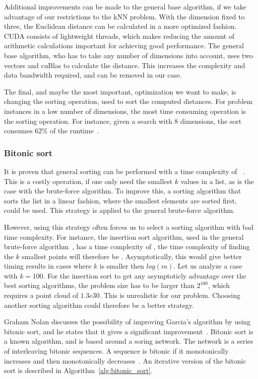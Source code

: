 Additional improvements can be made to the general base algorithm, if we take advantage of our restrictions to the kNN problem. With the dimension fixed to three, the Euclidean distance can be calculated in a more optimized fashion. CUDA consists of lightweight threads, which makes reducing the amount of arithmetic calculations important for achieving good performance. The general base algorithm, who has to take any number of dimensions into account, uses two vectors and cuBlas to calculate the distance. This increases the complexity and data bandwidth required, and can be removed in our case.

The final, and maybe the most important, optimization we want to make, is changing the sorting operation, used to sort the computed distances. For problem instances in a low number of dimensions, the most time consuming operation is the sorting operation. For instance, given a search with $8$ dimensions, the sort consumes $62\%$ of the runtime~\cite{Garcia2008}.

\subsubsection{Bitonic sort} %
\label{ssub:bitonic_sort}

It is proven that general sorting can be performed with a time complexity of ~\cite{Cormen:2001}. This is a costly operation, if one only need the smallest $k$ values in a list, as is the case with the brute-force algorithm. To improve this, a sorting algorithm that sorts the list in a linear fashion, where the smallest elements are sorted first, could be used. This strategy is applied to the general brute-force algorithm.

However, using this strategy often forces us to select a sorting algorithm with bad time complexity. For instance, the insertion sort algorithm, used in the general brute-force algorithm~\cite{Cormen:2001}, has a time complexity of , the time complexity of finding the $k$ smallest points will therefore be . Asymptotically, this would give better timing results in cases where $k$ is smaller then $log(m)$. Let us analyze a case with $k=100$. For the insertion sort to get any asymptoticly advantage over the best sorting algorithms, the problem size has to be larger than $2^{100}$, which requires a point cloud of $1.3e30$. This is unrealistic for our problem. Choosing another sorting algorithm could therefore be a better strategy.

Graham Nolan discusses the possibility of improving Garcia's algorithm by using bitonic sort, and he states that it gives a significant improvement~\citep{Nolan}. Bitonic sort is a known  algorithm, and is based around a soring network. The network is a series of interleaving bitonic sequences. A sequence is bitonic if it monotonically increases and then monotonically decreases~\cite{Cormen:2001}. An iterative version of the bitonic sort is described in Algorithm~\ref{alg:bitonic_sort}.

